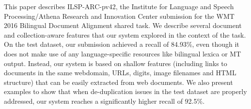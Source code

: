 This paper describes ILSP-ARC-pv42, the Institute for Language and Speech Processing/Athena Research and Innovation Center submission for the WMT 2016 Bilingual Document Alignment shared task. We describe several document and collection-aware features that our system explored in the context of the task. On the test dataset, our submission achieved a recall of 84.93\%, even though it does not make use of any language-specific resources like bilingual lexica or MT output. Instead, our system is based on shallow features (including links to documents in the same webdomain, URLs, digits, image filenames and HTML structure) that can be easily extracted from web documents. We also present examples to show that when de-duplication issues in the test dataset are properly addressed, our system reaches a significantly higher recall of 92.5\%.
